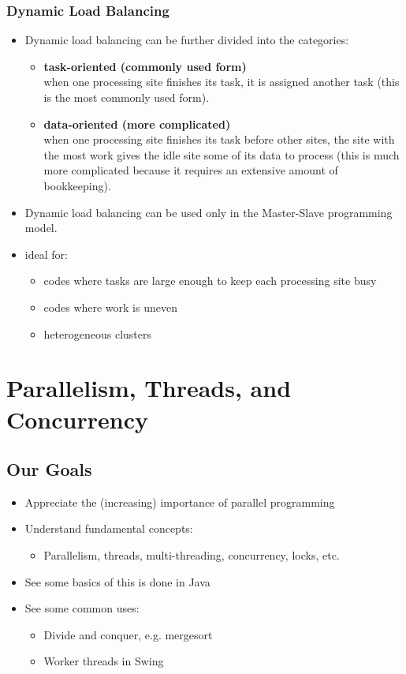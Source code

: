 \documentclass[12pt, a4paper]{book}
\begin{document}
\subsection{Dynamic Load Balancing}
\begin{itemize}
    \item Dynamic load balancing can be further divided into the categories:
          \begin{itemize}
              \item \textbf{task-oriented (commonly used form)} \\
                    when one processing site finishes its task, it is assigned another task (this is the most commonly used form).
              \item \textbf{data-oriented (more complicated)}\\
                    when one processing site finishes its task before other sites, the site with the most work gives the idle site some of its data to process (this is much more complicated because it requires an extensive amount of bookkeeping).
          \end{itemize}
    \item Dynamic load balancing can be used only in the Master-Slave programming model.
    \item ideal for: \begin{itemize}
              \item codes where tasks are large enough to keep each processing site busy
              \item codes where work is uneven
              \item heterogeneous clusters
          \end{itemize}
\end{itemize}

\chapter{Parallelism, Threads, and Concurrency}
\section{Our Goals}
\begin{itemize}
    \item Appreciate the (increasing) importance of parallel programming
    \item  Understand fundamental concepts:
          \begin{itemize}
              \item Parallelism, threads, multi-threading, concurrency, locks, etc.
          \end{itemize}
    \item See some basics of this is done in Java
    \item See some common uses:
          \begin{itemize}
              \item  Divide and conquer, e.g. mergesort
              \item Worker threads in Swing
          \end{itemize}
\end{itemize}
\end{document}
